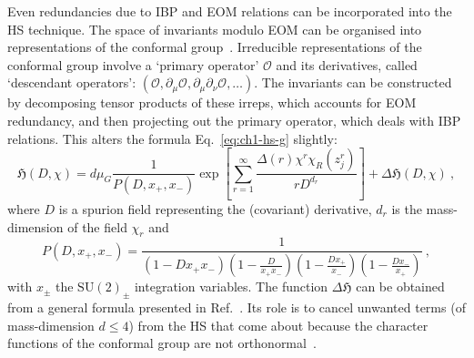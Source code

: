 Even redundancies due to IBP and EOM relations can be incorporated into the HS
technique. The space of invariants modulo EOM can be organised into
representations of the conformal group~\cite{Henning:2017fpj, Henning:2015alf}.
Irreducible representations of the conformal group involve a `primary operator'
$\mathcal{O}$ and its derivatives, called `descendant operators':
$(\mathcal{O}, \partial_{\mu}\mathcal{O}, \partial_{\mu}\partial_{\nu}\mathcal{O}, \ldots)$.
The invariants can be constructed by decomposing tensor products of these
irreps, which accounts for EOM redundancy, and then projecting out the primary
operator, which deals with IBP relations. This alters the formula
Eq.~\eqref{eq:ch1-hs-g} slightly:
\begin{equation}
  \label{eq:ch1-hs-full}
  \mathfrak{H}(D, \chi) = d\mu_{G} \frac{1}{P(D, x_{+}, x_{-})} \exp \left[ \sum_{r=1}^{\infty} \frac{\Delta(r) \chi^{r} \chi_{R}(z_{j}^{r})}{r D^{d_{r}}} \right] + \Delta \mathfrak{H}(D, \chi) \ ,
\end{equation}
where $D$ is a spurion field representing the (covariant) derivative, $d_{r}$ is
the mass-dimension of the field $\chi_{r}$ and
\begin{equation}
  P(D, x_{+}, x_{-}) = \frac{1}{(1-Dx_{+}x_{-})\left(1-\frac{D}{x_{+}x_{-}}\right)\left(1-\frac{Dx_{+}}{x_{-}}\right)\left(1 - \frac{Dx_{-}}{x_{+}}\right)} \ ,
\end{equation}
with $x_{\pm}$ the $\mathrm{SU}(2)_{\pm}$ integration variables. The function
$\Delta \mathfrak{H}$ can be obtained from a general formula presented in
Ref.~\cite{Henning:2017fpj}. Its role is to cancel unwanted terms (of
mass-dimension $d \leq 4$) from the HS that come about because the character
functions of the conformal group are not orthonormal~\cite{Henning:2017fpj}.

